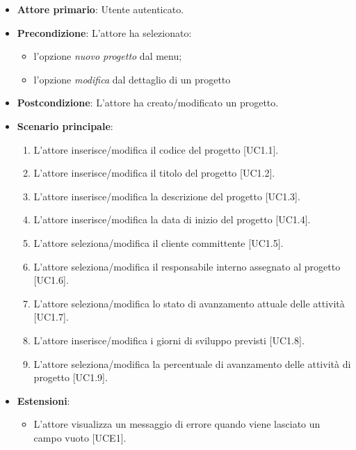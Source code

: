 \begin{itemize}
\item \textbf{Attore primario}: Utente autenticato.
\item \textbf{Precondizione}: L'attore ha selezionato: 
\begin{itemize}
\item l'opzione \textit{nuovo progetto} dal menu;
\item l'opzione \textit{modifica} dal dettaglio di un progetto
\end{itemize}
\item \textbf{Postcondizione}: L'attore ha creato/modificato un progetto.
\item \textbf{Scenario principale}: 
\begin{enumerate}
\item L'attore inserisce/modifica il codice del progetto [UC1.1].
\item L'attore inserisce/modifica il titolo del progetto [UC1.2].
\item L'attore inserisce/modifica la descrizione del progetto [UC1.3].
\item L'attore inserisce/modifica la data di inizio del progetto [UC1.4].
\item L'attore seleziona/modifica il cliente committente [UC1.5].
\item L'attore seleziona/modifica il responsabile interno assegnato al progetto [UC1.6].
\item L'attore seleziona/modifica lo stato di avanzamento attuale delle attività [UC1.7].
\item L'attore inserisce/modifica i giorni di sviluppo previsti [UC1.8].
\item L'attore seleziona/modifica la percentuale di avanzamento delle attività di progetto [UC1.9].
\end{enumerate}
\item \textbf{Estensioni}: 
\begin{itemize}
\item L'attore visualizza un messaggio di errore quando viene lasciato un campo vuoto [UCE1].
\end{itemize} 
\end{itemize}

\pagebreak

